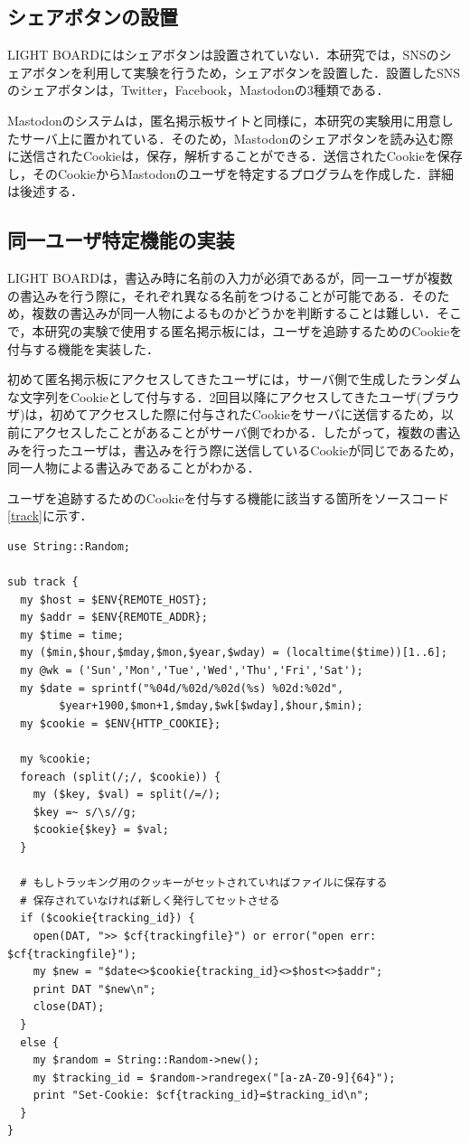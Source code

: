 \documentclass[10pt, a4paper]{jreport}
\begin{document}
\subsection{シェアボタンの設置}
LIGHT BOARDにはシェアボタンは設置されていない．本研究では，SNSのシェアボタンを利用して実験を行うため，シェアボタンを設置した．設置したSNSのシェアボタンは，Twitter，Facebook，Mastodonの3種類である．

Mastodonのシステムは，匿名掲示板サイトと同様に，本研究の実験用に用意したサーバ上に置かれている．そのため，Mastodonのシェアボタンを読み込む際に送信されたCookieは，保存，解析することができる．送信されたCookieを保存し，そのCookieからMastodonのユーザを特定するプログラムを作成した．詳細は後述する．

\subsection{同一ユーザ特定機能の実装}
LIGHT BOARDは，書込み時に名前の入力が必須であるが，同一ユーザが複数の書込みを行う際に，それぞれ異なる名前をつけることが可能である．そのため，複数の書込みが同一人物によるものかどうかを判断することは難しい．そこで，本研究の実験で使用する匿名掲示板には，ユーザを追跡するためのCookieを付与する機能を実装した．

初めて匿名掲示板にアクセスしてきたユーザには，サーバ側で生成したランダムな文字列をCookieとして付与する．2回目以降にアクセスしてきたユーザ(ブラウザ)は，初めてアクセスした際に付与されたCookieをサーバに送信するため，以前にアクセスしたことがあることがサーバ側でわかる．したがって，複数の書込みを行ったユーザは，書込みを行う際に送信しているCookieが同じであるため，同一人物による書込みであることがわかる．

ユーザを追跡するためのCookieを付与する機能に該当する箇所をソースコード\ref{track}に示す．

\begin{lstlisting}[caption=同一ユーザ特定機能,label=track]
use String::Random;

sub track {
  my $host = $ENV{REMOTE_HOST};
  my $addr = $ENV{REMOTE_ADDR};
  my $time = time;
  my ($min,$hour,$mday,$mon,$year,$wday) = (localtime($time))[1..6];
  my @wk = ('Sun','Mon','Tue','Wed','Thu','Fri','Sat');
  my $date = sprintf("%04d/%02d/%02d(%s) %02d:%02d",
        $year+1900,$mon+1,$mday,$wk[$wday],$hour,$min);
  my $cookie = $ENV{HTTP_COOKIE};

  my %cookie;
  foreach (split(/;/, $cookie)) {
    my ($key, $val) = split(/=/);
    $key =~ s/\s//g;
    $cookie{$key} = $val;
  }

  # もしトラッキング用のクッキーがセットされていればファイルに保存する
  # 保存されていなければ新しく発行してセットさせる
  if ($cookie{tracking_id}) {
    open(DAT, ">> $cf{trackingfile}") or error("open err: $cf{trackingfile}");
    my $new = "$date<>$cookie{tracking_id}<>$host<>$addr";
    print DAT "$new\n";
    close(DAT);
  }
  else {
    my $random = String::Random->new();
    my $tracking_id = $random->randregex("[a-zA-Z0-9]{64}");
    print "Set-Cookie: $cf{tracking_id}=$tracking_id\n";
  }
}
\end{lstlisting}
\end{document}
